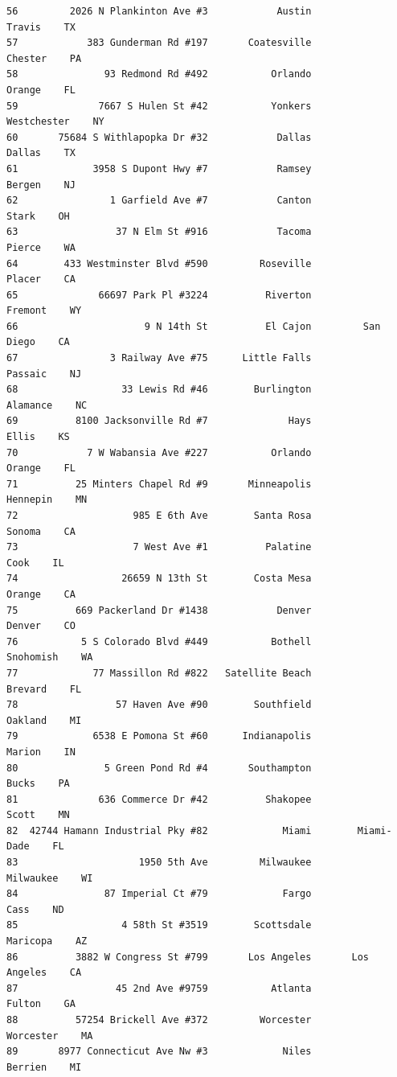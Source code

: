 \documentclass[
  12pt,
]{article}
\begin{document}
\begin{verbatim}
56         2026 N Plankinton Ave #3            Austin            Travis    TX
57            383 Gunderman Rd #197       Coatesville           Chester    PA
58               93 Redmond Rd #492           Orlando            Orange    FL
59              7667 S Hulen St #42           Yonkers       Westchester    NY
60       75684 S Withlapopka Dr #32            Dallas            Dallas    TX
61             3958 S Dupont Hwy #7            Ramsey            Bergen    NJ
62                1 Garfield Ave #7            Canton             Stark    OH
63                 37 N Elm St #916            Tacoma            Pierce    WA
64        433 Westminster Blvd #590         Roseville            Placer    CA
65              66697 Park Pl #3224          Riverton           Fremont    WY
66                      9 N 14th St          El Cajon         San Diego    CA
67                3 Railway Ave #75      Little Falls           Passaic    NJ
68                  33 Lewis Rd #46        Burlington          Alamance    NC
69          8100 Jacksonville Rd #7              Hays             Ellis    KS
70            7 W Wabansia Ave #227           Orlando            Orange    FL
71          25 Minters Chapel Rd #9       Minneapolis          Hennepin    MN
72                    985 E 6th Ave        Santa Rosa            Sonoma    CA
73                    7 West Ave #1          Palatine              Cook    IL
74                  26659 N 13th St        Costa Mesa            Orange    CA
75          669 Packerland Dr #1438            Denver            Denver    CO
76           5 S Colorado Blvd #449           Bothell         Snohomish    WA
77             77 Massillon Rd #822   Satellite Beach           Brevard    FL
78                 57 Haven Ave #90        Southfield           Oakland    MI
79             6538 E Pomona St #60      Indianapolis            Marion    IN
80               5 Green Pond Rd #4       Southampton             Bucks    PA
81              636 Commerce Dr #42          Shakopee             Scott    MN
82  42744 Hamann Industrial Pky #82             Miami        Miami-Dade    FL
83                     1950 5th Ave         Milwaukee         Milwaukee    WI
84               87 Imperial Ct #79             Fargo              Cass    ND
85                  4 58th St #3519        Scottsdale          Maricopa    AZ
86          3882 W Congress St #799       Los Angeles       Los Angeles    CA
87                 45 2nd Ave #9759           Atlanta            Fulton    GA
88          57254 Brickell Ave #372         Worcester         Worcester    MA
89       8977 Connecticut Ave Nw #3             Niles           Berrien    MI

\end{verbatim}
\end{document}
